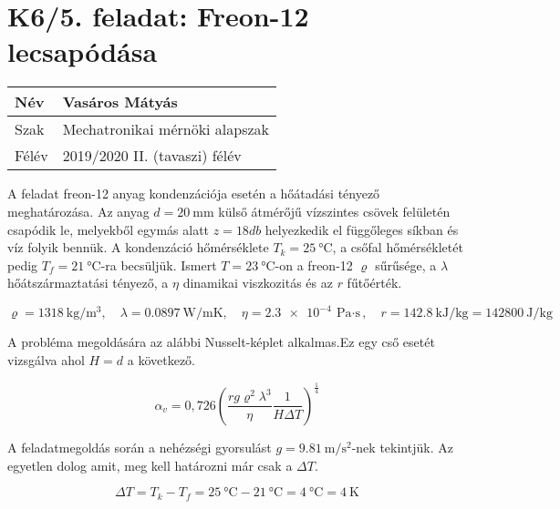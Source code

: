 \section*{K6/5. feladat: Freon-12 lecsapódása}

\begin{tabular}{ | p{2cm} | p{14cm} | } 
	\hline
	Név & Vasáros Mátyás \\ 
	\hline
	Szak & Mechatronikai mérnöki alapszak\\ 
	\hline
	Félév & 2019/2020 II. (tavaszi) félév \\ 
	\hline
\end{tabular}
\vspace{0.5cm}

\noindent A feladat freon-12 anyag kondenzációja esetén a hőátadási tényező meghatározása. Az anyag $ d=\SI {20}{\milli\meter}$ külső átmérőjű vízszintes csövek felületén csapódik le, melyekből egymás alatt $z= 18db$ helyezkedik el függőleges síkban és víz folyik bennük. A kondenzáció hőmérséklete $T_{k}=\SI{25}{\degreeCelsius}$, a csőfal hőmérsékletét pedig $T_f=\SI{21}{\degreeCelsius}$-ra becsüljük. Ismert $T=\SI{23}{\degreeCelsius}$-on a freon-12 $\varrho$ sűrűsége, a $\lambda$ hőátszármaztatási tényező, a $\eta$ dinamikai viszkozitás és az $r$ fűtőérték.

\begin{equation*}
	\varrho=\SI{1318}{\kilogram\per\meter\cubed},
	\quad 
	\lambda=\SI{0,0897}{\watt\per\meter\kelvin},
	\quad 
	\eta=\SI{2,3e-4}{\pascal\cdot\second },
	\quad 
	r=\SI{142,8}{\kilo\joule\per\kilogram}=\SI{142800}{\joule\per\kilogram}
\end{equation*}

\noindent\hrulefill

\noindent A probléma megoldására az alábbi Nusselt-képlet alkalmas.Ez egy cső esetét vizsgálva ahol $H=d$ a következő.

\begin{equation}
\alpha_{v}=0,726\left(\dfrac{r g \varrho^2 \lambda^3 }{\eta}\dfrac{1}{H \Delta T} \right)^\tfrac{1}{4}
\end{equation} 

\noindent A feladatmegoldás során a nehézségi gyorsulást $g=\SI{9,81}{\meter\per\second\squared}$-nek tekintjük. Az egyetlen dolog amit, meg kell határozni már csak a $\Delta T$.

\begin{equation}
\Delta T = T_k-T_f=\SI{25}{\degreeCelsius}-\SI{21}{\degreeCelsius}=\SI{4}{\degreeCelsius}=\SI{4}{\kelvin}
\end{equation} 

